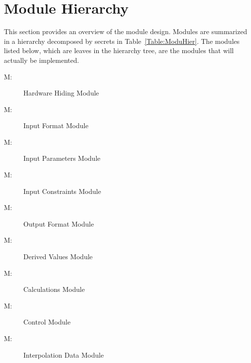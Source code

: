 \documentclass[12pt]{article}
\newcounter{modnum}
\newcommand{\mthemodnum}{M\themodnum}
\begin{document}
\section{Module Hierarchy}
\label{Sec:ModuHier}
This section provides an overview of the module design. Modules are summarized in a hierarchy decomposed by secrets in Table~\ref{Table:ModuHier}. The modules listed below, which are leaves in the hierarchy tree, are the modules that will actually be implemented.
\begin{description}
\item[\mthemodnum\label{MhwHiding}:]Hardware Hiding Module
\end{description}
\begin{description}
\item[\mthemodnum\label{MmodInputFormat}:]Input Format Module
\end{description}
\begin{description}
\item[\mthemodnum\label{MmodInputParams}:]Input Parameters Module
\end{description}
\begin{description}
\item[\mthemodnum\label{MmodInputConstraints}:]Input Constraints Module
\end{description}
\begin{description}
\item[\mthemodnum\label{Mmodoutputfdesc}:]Output Format Module
\end{description}
\begin{description}
\item[\mthemodnum\label{MmodDerivedVals}:]Derived Values Module
\end{description}
\begin{description}
\item[\mthemodnum\label{Mmodcalcdesc}:]Calculations Module
\end{description}
\begin{description}
\item[\mthemodnum\label{MmodControl}:]Control Module
\end{description}
\begin{description}
\item[\mthemodnum\label{MmodInterpData}:]Interpolation Data Module
\end{description}
\end{document}

